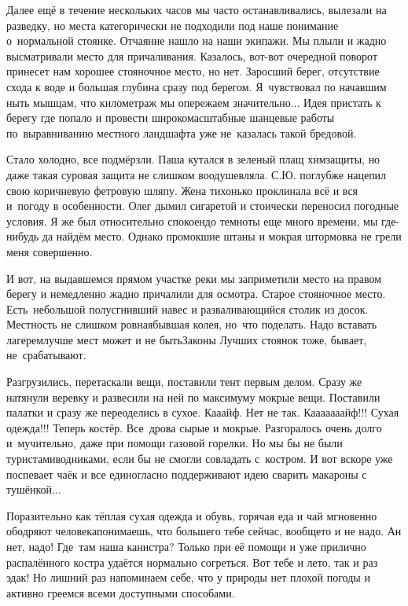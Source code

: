 Далее ещё в течение нескольких часов мы часто останавливались, вылезали на разведку, но места категорически не подходили под наше понимание о~нормальной стоянке. Отчаяние нашло на наши экипажи. Мы плыли и жадно высматривали место для причаливания. Казалось, вот-вот очередной поворот принесет нам хорошее стояночное место, но нет. Заросший берег, отсутствие схода к воде и большая глубина сразу под берегом. Я~чувствовал по начавшим ныть мышцам, что километраж мы опережаем значительно$\ldots$ Идея пристать к берегу где попало и провести широкомасштабные шанцевые работы по~выравниванию местного ландшафта уже не~казалась такой бредовой.

Стало холодно, все подмёрзли. Паша кутался в зеленый плащ химзащиты, но даже такая суровая защита не слишком воодушевляла. С.Ю. поглубже нацепил свою коричневую фетровую шляпу. Жена тихонько проклинала всё и вся и~погоду в особенности. Олег дымил сигаретой и стоически переносил погодные условия. Я же был относительно спокоен\mdash до темноты еще много времени, мы где-нибудь да найдём место. Однако промокшие штаны и мокрая штормовка не грели меня совершенно.

И вот, на выдавшемся прямом участке реки мы заприметили место на правом берегу и немедленно жадно причалили для осмотра. Старое стояночное место. Есть~небольшой полусгнивший навес и разваливающийся столик из досок. Местность не слишком ровная\mdash бывшая колея, но~что поделать. Надо вставать лагерем\mdash лучше мест может и не быть\mdash Законы Лучших стоянок тоже, бывает, не~срабатывают.

Разгрузились, перетаскали вещи, поставили тент первым делом. Сразу же натянули веревку и развесили на ней по максимуму мокрые вещи. Поставили палатки и сразу же переоделись в сухое. Ка\sdash а\sdash айф. Нет не так. К\sdash а\sdash а\sdash а\sdash а\sdash а\sdash а\sdash айф!!! Сухая одежда!!! Теперь костёр. Все~дрова сырые и мокрые. Разгоралось очень долго и~мучительно, даже при помощи газовой горелки. Но мы бы не были туристами\sdash водниками, если бы не смогли совладать с~костром. И вот вскоре уже поспевает чаёк и все единогласно поддерживают идею сварить макароны с тушёнкой$\ldots$

Поразительно как тёплая сухая одежда и обувь, горячая еда и чай мгновенно ободряют человека\mdash понимаешь, что большего тебе сейчас, вообще\sdash то и не надо. Ан нет, надо! Где~там наша канистра? Только при её помощи и уже прилично распалённого костра удаётся нормально согреться. Вот тебе и лето, так и раз эдак! Но лишний раз напоминаем себе, что у природы нет плохой погоды и активно греемся всеми доступными способами.
 
